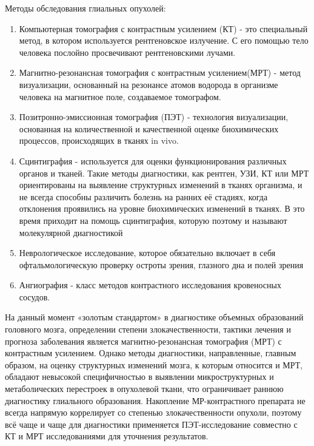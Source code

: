 Методы обследования глиальных опухолей: 
\begin{enumerate}
    \item Компьютерная томография с контрастным усилением (КТ) - это специальный метод, в котором 
    используется рентгеновское излучение. С его помощью тело человека послойно просвечивают рентгеновскими лучами. 

    \item  Магнитно-резонансная томография  с контрастным усилением(МРТ) - 
    метод визуализации, основанный на резонансе атомов водорода в организме 
    человека на магнитное поле,  создаваемое томографом.


    \item  Позитронно-эмиссионная томография  (ПЭТ) - технология визуализации, основанная на количественной и качественной оценке биохимических процессов, происходящих в тканях in vivo. 
    \item  Сцинтиграфия  - используется для оценки функционирования различных органов и тканей. Такие методы диагностики, как рентген, УЗИ, КТ или МРТ ориентированы на выявление структурных изменений в тканях организма, и не всегда способны различить болезнь на ранних её стадиях, когда отклонения проявились на уровне биохимических изменений в тканях. В это время приходит на помощь сцинтиграфия, которую поэтому и называют молекулярной диагностикой
    \item Неврологическое исследование, которое обязательно включает в себя офтальмологическую проверку остроты зрения, глазного дна и полей зрения
    \item Ангиография -  класс методов контрастного исследования кровеносных сосудов.

\end{enumerate}


На данный момент «золотым стандартом» в диагностике объемных образований головного мозга, 
определении степени злокачественности, тактики лечения и прогноза заболевания 
является магнитно-резонансная томография (МРТ) с контрастным усилением. 
Однако методы диагностики, направленные, главным образом, на оценку 
структурных изменений мозга, к которым относится и МРТ, обладают 
невысокой специфичностью в выявлении микроструктурных и  метаболических 
перестроек в опухолевой ткани, что ограничивает раннюю диагностику глиального 
образования. Накопление МР-контрастного препарата не всегда напрямую коррелирует 
со степенью злокачественности опухоли, поэтому всё чаще и чаще для диагностики применяется ПЭТ-исследование 
совместно с КТ и МРТ исследованиями для уточнения результатов. \par

